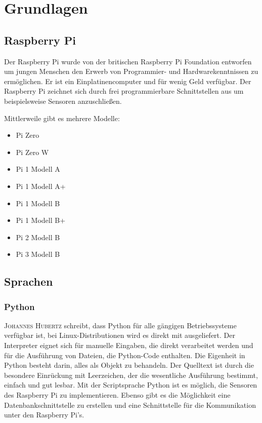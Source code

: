\chapter{Grundlagen}

\section{Raspberry Pi}
Der Raspberry Pi wurde von der britischen Raspberry Pi Foundation entworfen um
jungen Menschen den Erwerb von Programmier- und Hardwarekenntnissen zu
ermöglichen. Er ist ein Einplatinencomputer und für wenig Geld verfügbar. Der
Raspberry Pi zeichnet sich durch frei programmierbare Schnittstellen aus um
beispielsweise Sensoren anzuschließen.

Mittlerweile gibt es mehrere Modelle:

\begin{itemize} 
\item Pi Zero 
\item Pi Zero W
\item Pi 1 Modell A
\item Pi 1 Modell A+
\item Pi 1 Modell B
\item Pi 1 Modell B+
\item Pi 2 Modell B
\item Pi 3 Modell B 
\end{itemize}


\section{Sprachen}

\subsection{Python}

\textsc{Johannes Hubertz}\cite{hubertz2016softwaretests} schreibt, dass Python für alle gängigen Betriebssysteme verfügbar ist, bei Linux-Distributionen wird es direkt mit ausgeliefert. Der Interpreter eignet sich für manuelle Eingaben, die direkt verarbeitet werden und für die Ausführung von Dateien, die Python-Code enthalten. Die Eigenheit in Python besteht darin, alles als Objekt zu behandeln. Der Quelltext ist durch die besondere Einrückung mit Leerzeichen, der die wesentliche Ausführung bestimmt, einfach und gut lesbar.  Mit der Scriptsprache Python ist es möglich, die Sensoren des Raspberry Pi zu implementieren. Ebenso gibt es die Möglichkeit eine Datenbankschnittstelle zu erstellen und eine Schnittstelle für die Kommunikation unter den Raspberry Pi's.

